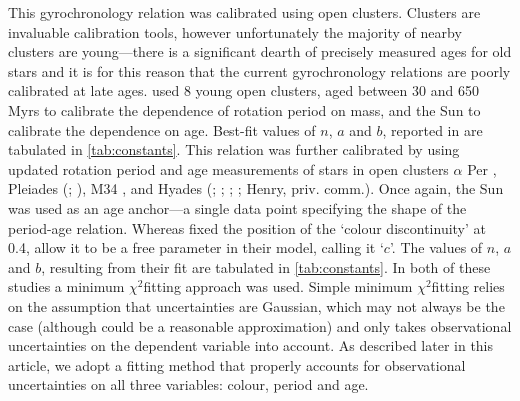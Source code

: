 \documentclass[10pt,preprint]{aastex}
\newcommand{\chit}{$\chi^2$}
\begin{document}
This gyrochronology relation was calibrated using open clusters.
Clusters are invaluable calibration tools, however unfortunately the majority of nearby clusters are young---there is a significant dearth of precisely measured ages for old stars and it is for this reason that the current gyrochronology relations are poorly calibrated at late ages.
\citet{Barnes2007} used 8 young open clusters, aged between 30 and 650 Myrs to calibrate the dependence of rotation period on mass, and the Sun to calibrate the dependence on age.
Best-fit values of $n$, $a$ and $b$, reported in \citet{Barnes2007} are tabulated in \ref{tab:constants}.
This relation was further calibrated by \citet{Mamajek2008} using updated rotation period and age measurements of stars in open clusters $\alpha$ Per \citep{Prosser1995}, Pleiades (\citealt{Prosser2005}; \citealt{Krishnamurthi1998}), M34 \citep{Meibom2011_M34}, and Hyades (\citealt{Radick1987}; \citealt{Prosser1995}; \citealt{Radick1995}; \citealt{Paulson2004}; Henry, priv. comm.).
Once again, the Sun was used as an age anchor---a single data point specifying the shape of the period-age relation.
Whereas \citet{Barnes2007} fixed the position of the `colour discontinuity' at 0.4, \citet{Mamajek2008} allow it to be a free parameter in their model, calling it `$c$'.
The values of $n$, $a$ and $b$, resulting from their fit are tabulated in \ref{tab:constants}.
In both of these studies a minimum \chit fitting approach was used.
Simple minimum \chit fitting relies on the assumption that uncertainties are Gaussian, which may not always be the case (although could be a reasonable approximation) and only takes observational uncertainties on the dependent variable into account.
As described later in this article, we adopt a fitting method that properly accounts for observational uncertainties on all three variables: colour, period and age.
\end{document}
